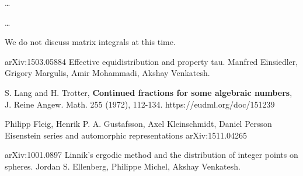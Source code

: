 \documentclass[12pt]{article}
\begin{document}
{\noindent \dots \newline

\noindent \dots \newline

\noindent We do not discuss matrix integrals at this time.

\begin{thebibliography}{9}

 arXiv:1503.05884 Effective equidistribution and property tau. Manfred Einsiedler, Grigory Margulis, Amir Mohammadi, Akshay Venkatesh.

 S. Lang and H. Trotter, \textbf{Continued fractions for some algebraic numbers}, J. Reine Angew. Math. 255 (1972), 112-134. https://eudml.org/doc/151239

 Philipp Fleig, Henrik P. A. Gustafsson, Axel Kleinschmidt, Daniel Persson
Eisenstein series and automorphic representations arXiv:1511.04265

arXiv:1001.0897 Linnik's ergodic method and the distribution of integer points on spheres. Jordan S. Ellenberg, Philippe Michel, Akshay Venkatesh. 

\end{thebibliography}



}
\end{document}
